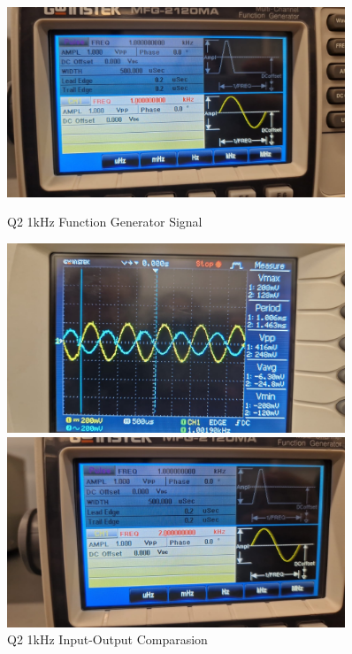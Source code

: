 \begin{figure}[h]
    \centering
    \begin{minipage}{0.5\textwidth}
        \includegraphics[width=0.9\textwidth , height=0.2\textheight]{assets/exp/q2-1khz-1vpp-signal.jpeg}
        \caption{Q2 1kHz Function Generator Signal}
        \label{fig:q2-1khz-1vpp-signal}
    \end{minipage}%
    \begin{minipage}{0.5\textwidth}
        \includegraphics[width=0.9\textwidth , height=0.2\textheight]{assets/exp/q2-1khz-1vpp-comp.jpeg}
        \caption{Q2 1kHz Input-Output Comparasion}
        \label{fig:q2-1khz-1vpp-comp}
    \end{minipage}
    \begin{minipage}{0.5\textwidth}
        \includegraphics[width=0.9\textwidth , height=0.2\textheight]{assets/exp/q2-2khz-1vpp-signal.jpeg}

\end{minipage}
\end{figure}
